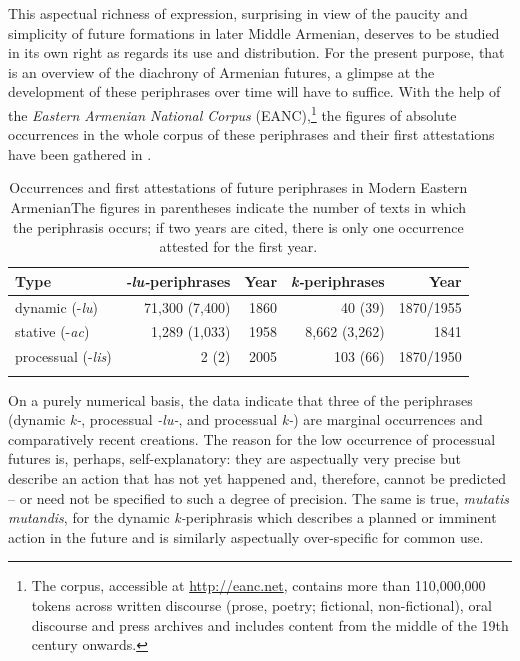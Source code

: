 \documentclass[output=paper,colorlinks,citecolor=brown]{langscibook}
\begin{document}
This aspectual richness of expression, surprising in view of the paucity and simplicity of future formations in later Middle Armenian, deserves to be studied in its own right as regards its use and distribution. For the present purpose, that is an overview of the diachrony of Armenian futures, a glimpse at the development of these periphrases over time will have to suffice. With the help of the \textit{Eastern Armenian National Corpus} (EANC),\footnote{The corpus, accessible at \href{http://eanc.net}{http://eanc.net}, contains more than 110,000,000 tokens across written discourse (prose, poetry; fictional, non-fictional), oral discourse and press archives and includes content from the middle of the 19th century onwards.} the figures of absolute occurrences in the whole corpus of these periphrases and their first attestations have been gathered in .

\begin{table}
	
	\caption{Occurrences and first attestations of future periphrases in Modern Eastern Armenian\newline The figures in parentheses indicate the number of texts in which the periphrasis occurs; if two years are cited, there is only one occurrence attested for the first year.}\label{tab:meyer:modarmfut2}
	\begin{tabularx}{1\textwidth}{Xrrrr}
		\lsptoprule
		Type         & \textit{-lu-}periphrases & Year & \textit{k-}periphrases  & Year      \\ \midrule
		dynamic (-\textit{lu})     & 71,300 (7,400)                   & 1860 & 40 (39)                        & 1870/1955 \\
		stative (-\textit{ac})     & 1,289 (1,033)                    & 1958 & 8,662 (3,262)                  & 1841      \\
		processual (-\textit{lis}) & 2 (2)                            & 2005 & 103 (66)                       & 1870/1950 \\
		\lspbottomrule          
	\end{tabularx}
\end{table}

On a purely numerical basis, the data indicate that three of the periphrases (dynamic \textit{k-}, processual \textit{-lu-}, and processual \textit{k-}) are marginal occurrences and comparatively recent creations. The reason for the low occurrence of processual futures is, perhaps, self-explanatory: they are aspectually very precise but describe an action that has not yet happened and, therefore, cannot be predicted – or need not be specified to such a degree of precision. The same is true, \textit{mutatis mutandis}, for the dynamic \textit{k-}periphrasis which describes a planned or imminent action in the future and is similarly aspectually over-specific for common use.
\end{document}
